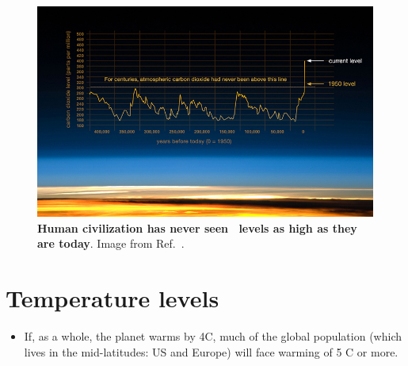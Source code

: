 \documentclass[11pt]{article}
\begin{document}
\begin{figure}
\centerline{\includegraphics[width=0.8\columnwidth]{Figures/co2_nasa.jpg}}
\caption{\textbf{Human civilization has never seen \cotwo\ levels as high as they are today}. Image from Ref.~\cite{NasaCO2}.} 
\label{Fig:co2_history}
\end{figure}

\section{Temperature levels}
\begin{itemize}
\item If, as a whole, the planet warms by 4\textdegree{}C, much of the global population (which lives in the mid-latitudes: US and Europe) will face warming of 5 \textdegree{}C or more.
\end{itemize}
\end{document}
